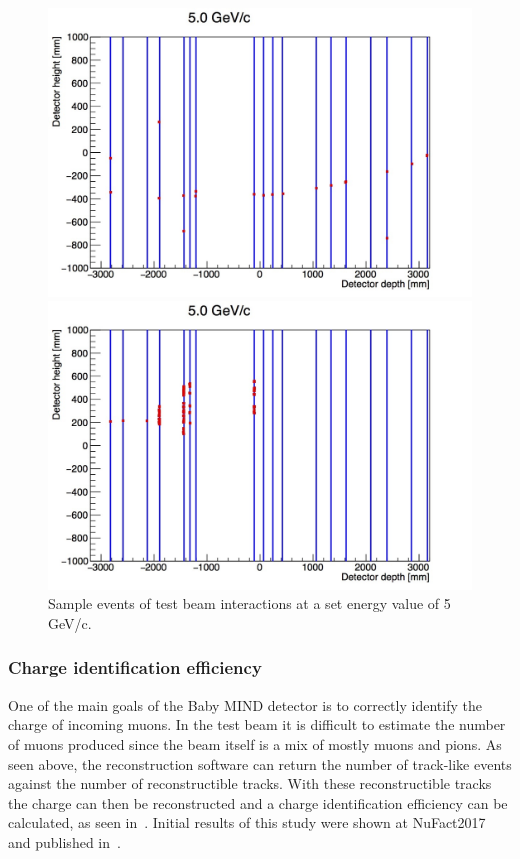 \begin{figure}[h!]
\centering
\includegraphics[width=\textwidth]{figures/oldStudies/m5GeVevent2.jpg}

\includegraphics[width=\textwidth]{figures/oldStudies/m5GeVevent3.jpg}
\caption{Sample events of test beam interactions at a set energy value of 5 GeV/c.}
\label{fig:EventsInitial}
\end{figure}

\subsubsection{Charge identification efficiency}
One of the main goals of the Baby MIND detector is to correctly identify the charge of incoming muons. In the test beam it is difficult to estimate the number of muons produced since the beam itself is a mix of mostly muons and pions. As seen above, the reconstruction software can return the number of track-like events against the number of reconstructible tracks. With these reconstructible tracks the charge can then be reconstructed and a charge identification efficiency can be calculated, as seen in~. Initial results of this study were shown at NuFact2017 and published in~\cite{82Uppsala}.


